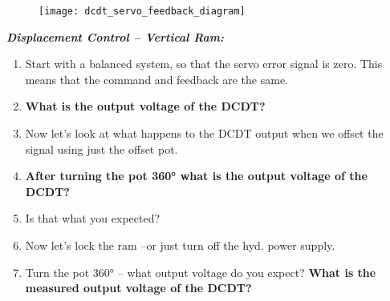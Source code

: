 \documentclass[10pt]{article}
\begin{document}
\begin{multicols}{2}
	\begin{figure}[H]
		\centering
		\texttt{[image: dcdt\_servo\_feedback\_diagram]}
		\label{fig:dcdt_servo}
	\end{figure}
	
	\noindent\textbf{\textit{Displacement Control -- Vertical Ram:}}
	\begin{enumerate}
		\item Start with a balanced system, so that the servo error signal is zero. This means that the command and feedback are the same.
		\item \textbf{What is the output voltage of the DCDT?} \vspace{15pt}
		\item Now let’s look at what happens to the DCDT output when we offset the signal using just the offset pot.
		\item \textbf{After turning the pot 360° what is the output voltage of the DCDT?} \vspace{15pt}
		\item Is that what you expected?
		\item Now let’s lock the ram –or just turn off the hyd. power supply.  
		\item Turn the pot 360° -- what output voltage do you expect? \textbf{What is the measured output voltage of the DCDT?} \vspace{15pt}
	\end{enumerate}
\end{multicols}


\clearpage
\end{document}
